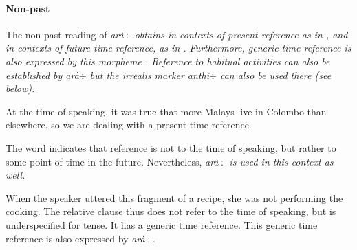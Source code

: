 \paragraph{Non-past}

The non-past reading of \em arà$\div$ \em obtains in contexts of present reference as in , and in contexts of future time reference, as in . Furthermore, generic time reference is also expressed by this morpheme . Reference to habitual activities can also be established by \em arà$\div$ \em {} but the irrealis marker \em anthi$\div$ \em  can also be used there (see below).


At the time of speaking, it was true that more Malays live in Colombo than elsewhere, so we are dealing with a present time reference.


The word  indicates that reference is not to the time of speaking, but rather to some point of time in the future. Nevertheless, \em arà$\div$  \em is used in this context as well.


When the speaker uttered this fragment of a recipe, she was not performing the cooking. The relative clause thus does not refer to the time of speaking, but is underspecified for tense. It has a generic time reference. This generic time reference is also expressed by \em arà$\div$\em.





